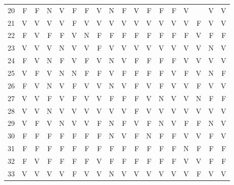 \begin{apendicesenv}
\begin{center}
\begin{tabular}{ l r r r r r r r r r r r r r r r r r}
	20	&	F	&	F	&	N	&	V	&	F	&	F	&	V	&	N	&	F	&	V	&	F	&	F	&	F	&	V	&		&	V	&	V	\\
	21	&	V	&	V	&	V	&	V	&	F	&	V	&	V	&	V	&	V	&	V	&	V	&	V	&	V	&	V	&	F	&	V	&	V	\\
	22	&	F	&	V	&	F	&	F	&	V	&	N	&	F	&	F	&	F	&	F	&	F	&	F	&	F	&	F	&	V	&	F	&	F	\\
	23	&	V	&	V	&	V	&	N	&	V	&	V	&	F	&	V	&	V	&	V	&	V	&	V	&	V	&	V	&	V	&	N	&	V	\\
	24	&	F	&	V	&	N	&	F	&	V	&	F	&	V	&	N	&	V	&	F	&	F	&	F	&	F	&	V	&	V	&	V	&	V	\\
	25	&	V	&	F	&	V	&	N	&	N	&	F	&	F	&	V	&	F	&	F	&	F	&	F	&	V	&	F	&	V	&	N	&	F	\\
	26	&	F	&	V	&	N	&	V	&	F	&	V	&	V	&	N	&	V	&	F	&	V	&	F	&	V	&	V	&	F	&	V	&	V	\\
	27	&	V	&	V	&	F	&	V	&	F	&	V	&	V	&	F	&	F	&	F	&	V	&	N	&	V	&	V	&	N	&	F	&	F	\\
	28	&	V	&	V	&	N	&	V	&	V	&	V	&	V	&	V	&	V	&	F	&	V	&	V	&	V	&	V	&	V	&	V	&	V	\\
	29	&	V	&	F	&	V	&	N	&	V	&	V	&	F	&	N	&	F	&	V	&	F	&	N	&	V	&	F	&	F	&	N	&	V	\\
	30	&	F	&	F	&	F	&	F	&	F	&	F	&	F	&	N	&	V	&	F	&	N	&	F	&	F	&	V	&	V	&	F	&	V	\\
	31	&	F	&	F	&	F	&	F	&	F	&	F	&	F	&	F	&	F	&	F	&	F	&	F	&	F	&	N	&	F	&	F	&	F	\\
	32	&	F	&	V	&	F	&	F	&	F	&	F	&	V	&	F	&	F	&	F	&	F	&	F	&	F	&	V	&	V	&	F	&	F	\\
	33	&	V	&	V	&	V	&	V	&	F	&	V	&	V	&	N	&	V	&	V	&	V	&	V	&	V	&	V	&	F	&	V	&	V	\\
	
	\hline
	\bottomrule
	\end{tabular}
\end{center}


\end{apendicesenv}
